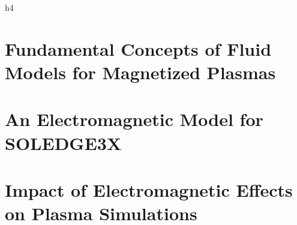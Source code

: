 \documentclass[english]{amu_these}
\begin{document}
	
										





	\tableofcontents					%
	\listoffigures						%
	\listoftables						%
	\printglossary[						%
		type=\acronymtype,
		title={List of acronymes},
		toctitle={List of acronymes}
		]
	\printglossary[						%
		title={Glossary},
		toctitle={Glossary}
		]
	\printglossary[						%
		type=notation,
		title={Naming convention},
		toctitle={Naming convention}
		]

	\ohead{\leftmark\Ifstr{\rightmark}{\leftmark}{}{ -- \rightmark}}	%
	h4
	\clearpage
	
	
	
	\part[Fundamental Concepts of Fluid Models for Magnetized Plasmas]{Fundamental Concepts of Fluid Models for Magnetized Plasmas}
	\label{part:FundamentalsPlasmaSimulations}
	
	
	

	\part[An Electromagnetic Model for SOLEDGE3X]{An Electromagnetic Model for SOLEDGE3X}
	\label{part:ElectromagneticModel}
	
	
	
	
	\part[Impact of Electromagnetic Effects on Plasma Simulations]{Impact of Electromagnetic Effects on Plasma Simulations}
	\label{part:EM_Impact}
	
	
	

	

	\appendix

	\newpage
	\printbibliography[heading=bibintoc] %
	
	\newpage
	\printindex							%
	
	\newpage
	\printendnotes						%

\end{document}
